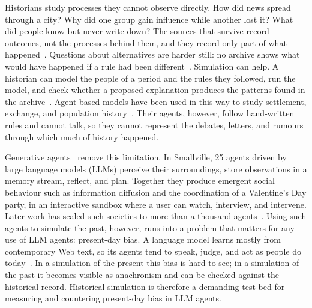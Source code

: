 \documentclass[sigconf,review,anonymous]{acmart}
\begin{document}
Historians study processes they cannot observe directly. How did news
spread through a city? Why did one group gain influence while another lost
it? What did people know but never write down? The sources that survive
record outcomes, not the processes behind them, and they record only part
of what happened~\cite{trouillot1995silencing}. Questions about
alternatives are harder still: no archive shows what would have happened
if a rule had been different~\cite{ferguson1997virtual}.
Simulation can help. A historian can model the people of a period and the
rules they followed, run the model, and check whether a proposed
explanation produces the patterns found in the
archive~\cite{epstein1996growing,epstein2006generative,gavin2014abm}.
Agent-based models have been used in this way to study settlement,
exchange, and population history~\cite{axtell2002population,romanowska2021abm}. Their agents, however, follow
hand-written rules and cannot talk, so they cannot represent the debates,
letters, and rumours through which much of history happened.

Generative agents~\cite{park2023generative} remove this limitation. In
Smallville, 25 agents driven by large language models (LLMs) perceive
their surroundings, store observations in a memory stream, reflect, and
plan. Together they produce emergent social behaviour such as information
diffusion and the coordination of a Valentine's Day party, in an
interactive sandbox where a user can watch, interview, and intervene.
Later work has scaled such societies to more than a thousand
agents~\cite{al2024projectsid,piao2025agentsociety}. Using such agents to
simulate the past, however, runs into a problem that matters for any use
of LLM agents: present-day bias. A language model learns mostly from
contemporary Web text, so its agents tend to speak, judge, and act as
people do today~\cite{santurkar2023opinions,wang2025identity}. In a
simulation of the present this bias is hard to see; in a simulation of the
past it becomes visible as anachronism and can be checked against the
historical record. Historical simulation is therefore a demanding test bed
for measuring and countering present-day bias in LLM agents.
\end{document}
